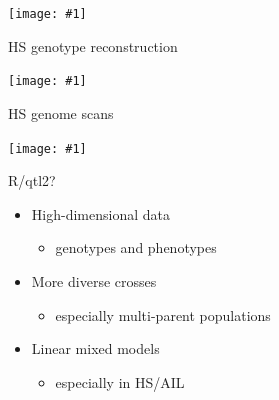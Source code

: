 \documentclass[12pt]{article}
\newcommand{\headsize}{\fontsize{35}{35} \selectfont}
\newcommand{\smallsize}{\fontsize{25}{30} \selectfont}
\newcommand{\smallersize}{\fontsize{20}{25} \selectfont}
\newcommand{\figh}[2]{\centerline{\texttt{[image: \#1]}}}
\begin{document}
\vspace{5mm}

\figh{Figs/genoprobsE.pdf}{0.9}


\newpage

\headsize \color{myyellow}
\hfill\begin{minipage}{6.75in}
\centering
HS genotype reconstruction
\end{minipage}

\vspace{5mm}

\figh{Figs/genoprobsF.pdf}{0.9}


\newpage

\headsize \color{myyellow}
\hfill\begin{minipage}{6.75in}
\centering
HS genome scans
\end{minipage}

\vspace{5mm}

\figh{Figs/do_scan.png}{0.9}



\newpage

\headsize \color{myyellow}
\hfill \begin{minipage}{5.75in}
\centering
R/qtl2?
\end{minipage}

\vspace{3cm}

\color{mywhite} \smallsize

\hfill \begin{minipage}[t]{9.5in}
\begin{itemize}
\itemsep24pt
\setlength{\rightskip}{0pt plus 1fil} %
\item High-dimensional data
  \begin{itemize}
  \item[] {\color{myblue} \smallersize genotypes and phenotypes}
  \end{itemize}
\item More diverse crosses
  \begin{itemize}
  \item[] {\color{myblue} \smallersize especially multi-parent populations}
  \end{itemize}
\item Linear mixed models
  \begin{itemize}
  \item[] {\color{myblue} \smallersize especially in HS/AIL}
  \end{itemize}
\end{itemize} \end{minipage}
\end{document}
